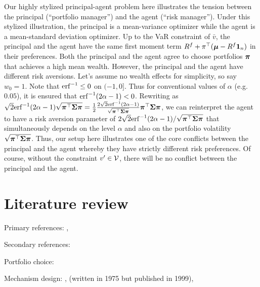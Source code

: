 \documentclass{article}
\theoremstyle{plain}
\theoremstyle{remark}
\begin{document}
Our highly stylized principal-agent problem here illustrates the tension between the principal (``portfolio manager'') and the agent (``risk manager''). Under this stylized illustration, the principal is a mean-variance optimizer while the agent is a mean-standard deviation optimizer. Up to the VaR constraint of $\bar{v}$, the principal and the agent have the same first moment term $R^f + \pi^\top( \boldsymbol{\mu} - R^f \mathbf{1}_n)$ in their preferences. Both the principal and the agent agree to choose portfolios $\boldsymbol{\pi}$ that achieves a high mean wealth. However, the principal and the agent have different risk aversions. Let's assume no wealth effects for simplicity, so say $w_0 = 1$. Note that $\mathrm{erf}^{-1} \le 0$ on $(-1, 0]$. Thus for conventional values of $\alpha$ (e.g.\ $0.05$), it is ensured that $\mathrm{erf}^{-1}(2 \alpha - 1) < 0$. Rewriting as $\sqrt{2} \mathrm{erf}^{-1}(2 \alpha - 1) \sqrt{\boldsymbol{\pi}^\top \boldsymbol{\Sigma} \boldsymbol{\pi}} = \frac{1}{2} \frac{2 \sqrt{2} \mathrm{erf}^{-1}(2 \alpha - 1) }{ \sqrt{\boldsymbol{\pi}^\top \boldsymbol{\Sigma} \boldsymbol{\pi}} } \boldsymbol{\pi}^\top \boldsymbol{\Sigma} \boldsymbol{\pi} $, we can reinterpret the agent to have a risk aversion parameter of $2 \sqrt{2} \mathrm{erf}^{-1}(2 \alpha - 1) / \sqrt{\boldsymbol{\pi}^\top \boldsymbol{\Sigma} \boldsymbol{\pi}}$ that simultaneously depends on the level $\alpha$ and also on the portfolio volatility $\sqrt{\boldsymbol{\pi}^\top \boldsymbol{\Sigma} \boldsymbol{\pi}}$. Thus, our setup here illustrates one of the core conflicts between the principal and the agent whereby they have strictly different risk preferences. Of course, without the constraint $v' \in \mathcal{V}$, there will be no conflict between the principal and the agent.




\section{Literature review}
Primary references: \cite{patton2019dynamic}, \cite{chen2016semiparametric}

Secondary references: \cite{dimitriadis2019joint}

Portfolio choice: \cite{brandt1999estimating}

Mechanism design: \cite{rogerson1985first}, \cite{mirrlees1999theory} (written in 1975 but published in 1999), \cite{jewitt1988justifying}
\end{document}
